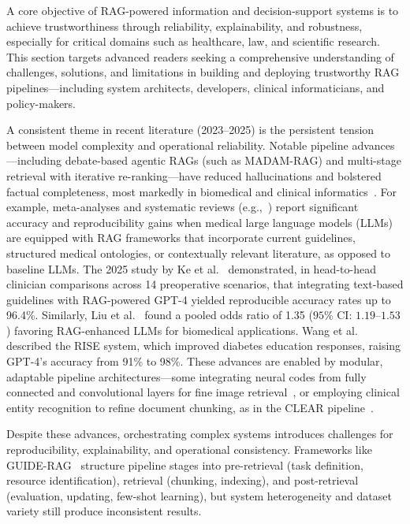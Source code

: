 \documentclass[sigconf]{acmart}
\begin{document}
A core objective of RAG-powered information and decision-support systems is to achieve trustworthiness through reliability, explainability, and robustness, especially for critical domains such as healthcare, law, and scientific research. This section targets advanced readers seeking a comprehensive understanding of challenges, solutions, and limitations in building and deploying trustworthy RAG pipelines—including system architects, developers, clinical informaticians, and policy-makers.

A consistent theme in recent literature (2023–2025) is the persistent tension between model complexity and operational reliability. Notable pipeline advances—including debate-based agentic RAGs (such as MADAM-RAG) and multi-stage retrieval with iterative re-ranking—have reduced hallucinations and bolstered factual completeness, most markedly in biomedical and clinical informatics~\cite{ref2,ref3,ref5,ref21,ref28,ref39,ref46,ref50,ref55,ref61}. For example, meta-analyses and systematic reviews (e.g.,~\cite{ref2,ref5,ref55}) report significant accuracy and reproducibility gains when medical large language models (LLMs) are equipped with RAG frameworks that incorporate current guidelines, structured medical ontologies, or contextually relevant literature, as opposed to baseline LLMs. The 2025 study by Ke et al.~\cite{ref2} demonstrated, in head-to-head clinician comparisons across 14 preoperative scenarios, that integrating text-based guidelines with RAG-powered GPT-4 yielded reproducible accuracy rates up to 96.4\%. Similarly, Liu et al.~\cite{ref5} found a pooled odds ratio of 1.35 ($95\%$ CI: $1.19$–$1.53$) favoring RAG-enhanced LLMs for biomedical applications. Wang et al.~\cite{ref55} described the RISE system, which improved diabetes education responses, raising GPT-4's accuracy from 91\% to 98\%. These advances are enabled by modular, adaptable pipeline architectures—some integrating neural codes from fully connected and convolutional layers for fine image retrieval~\cite{ref21:2022}, or employing clinical entity recognition to refine document chunking, as in the CLEAR pipeline~\cite{ref3:2025}.

Despite these advances, orchestrating complex systems introduces challenges for reproducibility, explainability, and operational consistency. Frameworks like GUIDE-RAG~\cite{ref5:2025} structure pipeline stages into pre-retrieval (task definition, resource identification), retrieval (chunking, indexing), and post-retrieval (evaluation, updating, few-shot learning), but system heterogeneity and dataset variety still produce inconsistent results.
\end{document}
